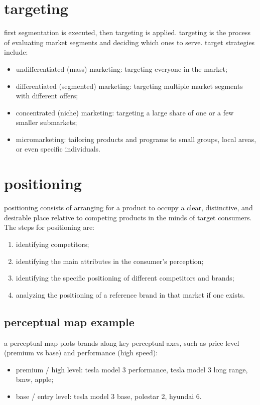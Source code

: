 \documentclass[12pt,a4paper]{report}
\begin{document}
\section{targeting}
first segmentation is executed, then targeting is applied. targeting is the process of evaluating market segments and deciding which ones to serve. target strategies include:
\begin{itemize}
\item undifferentiated (mass) marketing: targeting everyone in the market;
\item differentiated (segmented) marketing: targeting multiple market segments with different offers;
\item concentrated (niche) marketing: targeting a large share of one or a few smaller submarkets;
\item micromarketing: tailoring products and programs to small groups, local areas, or even specific individuals.
\end{itemize}   

\section{positioning}
positioning consists of arranging for a product to occupy a clear, distinctive, and desirable place relative to competing products in the minds of target consumers.
The steps for positioning are:
\begin{enumerate}
\item identifying competitors;
\item identifying the main attributes in the consumer's perception;
\item identifying the specific positioning of different competitors and brands;
\item analyzing the positioning of a reference brand in that market if one exists.
\end{enumerate}   

\subsection{perceptual map example}
a perceptual map plots brands along key perceptual axes, such as price level (premium vs base) and performance (high speed):
\begin{itemize}
\item premium / high level: tesla model 3 performance, tesla model 3 long range, bmw, apple;
\item base / entry level: tesla model 3 base, polestar 2, hyundai 6.
\end{itemize}
\end{document}
